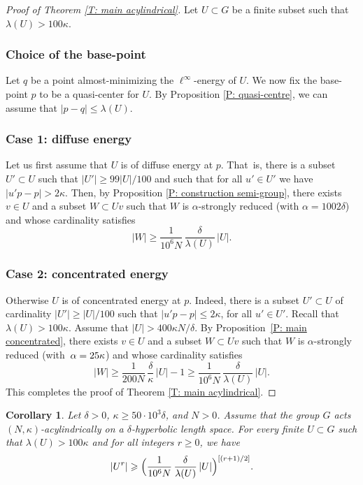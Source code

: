 \documentclass[JEP,XML,SOM,Unicode, NoEqCountersInSection,published]{cedram}
\theoremstyle{plain}
\newtheorem{cor}[thm]{Corollary}
\theoremstyle{definition}
\begin{document}
\begin{proof}[Proof of Theorem \ref{T: main acylindrical}]
Let $U\subset G$ be a finite subset such that $\lambda(U)>100\kappa$.

\subsubsection*{Choice of the base-point} Let $q$ be a point almost-minimizing the $\ell^{\infty}$-energy of $U$. We now fix the base-point $p$ to be a quasi-center for $U$. By Proposition \ref{P: quasi-centre}, we can assume that $|p-q|\leqslant \lambda(U)$.

\subsubsection*{Case 1: diffuse energy} Let us first assume that $U$ is of diffuse energy at $p$. That~is, there is a subset $U'\subset U$ such that $|U'|\geqslant 99|U|/100$ and such that for all $u'\in U'$ we have $|u'p-p|>2\kappa$.
Then, by Proposition \ref{P: construction semi-group}, there exists $v \in U$ and a subset $W \subset Uv$ such that $W$ is $\alpha$-strongly reduced (with $\alpha = 1002\delta$) and whose cardinality satisfies
\begin{equation*}
|W| \geq \frac 1{10^6N}\,\frac \delta{\lambda(U)}\, |U|.
\end{equation*}

\subsubsection*{Case 2: concentrated energy} Otherwise $U$ is of concentrated energy at $p$. Indeed, there is a subset $U'\subset U$ of cardinality $|U'|\geqslant |U|/100$ such that $|u'p-p|\leqslant 2\kappa$, for all $u'\in U'$.
Recall that $\lambda(U) > 100\kappa$.
Assume that $|U| > 400\kappa N /\delta$.
By Proposition~\ref{P: main concentrated}, there exists $v \in U$ and a subset $W \subset Uv$ such that $W$ is $\alpha$-strongly reduced (with~$\alpha =\nobreak 25\kappa$) and whose cardinality satisfies
\begin{equation*}
|W| \geq \frac 1{200N}\,\frac \delta{\kappa}\, |U|-1 \geq \frac 1{10^6N}\,\frac \delta{\lambda(U)}\, |U|.
\end{equation*}
This completes the proof of Theorem \ref{T: main acylindrical}. \end{proof}

\begin{cor}\label{T: acylindrical}
Let $\delta >0$, $\kappa\geqslant 50\cdot 10^3\delta$, and $N>0$.
Assume that the group $G$ acts $(N,\kappa)$-acylindrically on a $\delta$-hyperbolic length space.
For every finite $U\subset G$ such that $\lambda(U)> 100\kappa$ and for all integers $r\geqslant 0$, we have
\[
|U^r|\geqslant \Bigl( \frac 1{10^6N}\,\frac \delta{\lambda(U)}\, |U| \Bigr)^{[(r+1)/2]} .
\]
\end{cor}
\end{document}
